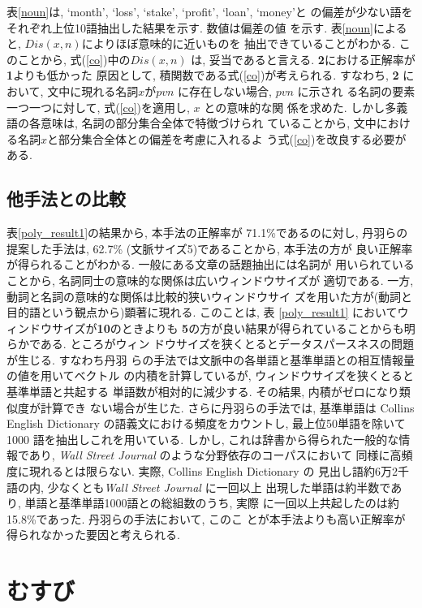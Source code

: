 \noindent
表\ref{noun}は, `month', `loss', `stake', `profit', `loan', `money'と
の偏差が少ない語をそれぞれ上位10語抽出した結果を示す.  数値は偏差の値
を示す.  表\ref{noun}によると, $Dis(x,n)$によりほぼ意味的に近いものを
抽出できていることがわかる.  このことから, 式(\ref{co})中の$Dis(x,n)$
は, 妥当であると言える.  {\bf 2}における正解率が{\bf 1}よりも低かった
原因として, 積関数である式(\ref{co})が考えられる.  すなわち, {\bf 2} 
において, 文中に現れる名詞$x$が$pvn$ に存在しない場合, $pvn$ に示され
る名詞の要素一つ一つに対して, 式(\ref{co})を適用し, $x$ との意味的な関
係を求めた.  しかし多義語の各意味は, 名詞の部分集合全体で特徴づけられ
ていることから, 文中における名詞$x$と部分集合全体との偏差を考慮に入れるよ
う式(\ref{co})を改良する必要がある.

\subsection{他手法との比較}

表\ref{poly_result1}の結果から, 本手法の正解率が 71.1\%であるのに対し, 
丹羽らの提案した手法は, 62.7\% (文脈サイズ5)であることから, 本手法の方が
良い正解率が得られることがわかる.  一般にある文章の話題抽出には名詞が
用いられていることから, 名詞同士の意味的な関係は広いウィンドウサイズが
適切である.  一方, 動詞と名詞の意味的な関係は比較的狭いウィンドウサイ
ズを用いた方が(動詞と目的語という観点から)顕著に現れる.  このことは, 
表
\ref{poly_result1} においてウィンドウサイズが{\bf 10}のときよりも{\bf
5}の方が良い結果が得られていることからも明らかである.  ところがウィン
ドウサイズを狭くとるとデータスパースネスの問題が生じる.  すなわち丹羽
らの手法では文脈中の各単語と基準単語との相互情報量の値を用いてベクトル
の内積を計算しているが, ウィンドウサイズを狭くとると基準単語と共起する
単語数が相対的に減少する.  その結果, 内積がゼロになり類似度が計算でき
ない場合が生じた.  さらに丹羽らの手法では, 基準単語は Collins English
Dictionary の語義文における頻度をカウントし, 最上位50単語を除いて1000
語を抽出しこれを用いている.  しかし, これは辞書から得られた一般的な情
報であり, {\it Wall Street Journal} のような分野依存のコーパスにおいて
同様に高頻度に現れるとは限らない.  実際, Collins English Dictionary の
見出し語約6万2千語の内, 少なくとも{\it Wall Street Journal} に一回以上
出現した単語は約半数であり, 単語と基準単語1000語との総組数のうち, 実際
に一回以上共起したのは約15.8\%であった.  丹羽らの手法において, このこ
とが本手法よりも高い正解率が得られなかった要因と考えられる.

\section{むすび}

